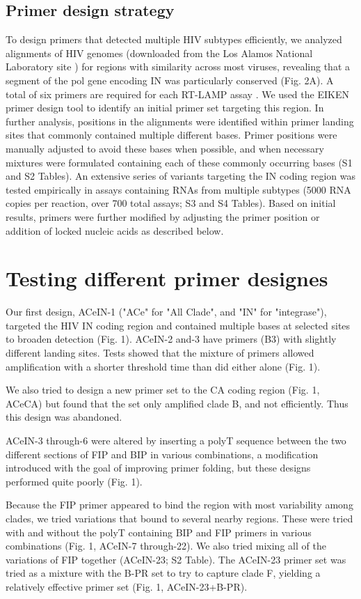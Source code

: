 \documentclass[../sherrill-Mix_thesis.tex]{subfiles}
\begin{document}
\subsection{Primer design strategy}
	To design primers that detected multiple HIV subtypes efficiently, we analyzed alignments of HIV genomes (downloaded from the Los Alamos National Laboratory site \citep{Kuiken2013}) for regions with similarity across most viruses, revealing that a segment of the pol gene encoding IN was particularly conserved (Fig. 2A). A total of six primers are required for each RT-LAMP assay \citep{Notomi2000}. We used the EIKEN primer design tool to identify an initial primer set targeting this region. In further analysis, positions in the alignments were identified within primer landing sites that commonly contained multiple different bases. Primer positions were manually adjusted to avoid these bases when possible, and when necessary mixtures were formulated containing each of these commonly occurring bases (S1 and S2 Tables). An extensive series of variants targeting the IN coding region was tested empirically in assays containing RNAs from multiple subtypes (5000 RNA copies per reaction, over 700 total assays; S3 and S4 Tables). Based on initial results, primers were further modified by adjusting the primer position or addition of locked nucleic acids as described below.

	\section{Testing different primer designes}
		Our first design, ACeIN-1 ("ACe" for "All Clade", and "IN" for "integrase"), targeted the HIV IN coding region and contained multiple bases at selected sites to broaden detection (Fig. 1). ACeIN-2 and-3 have primers (B3) with slightly different landing sites. Tests showed that the mixture of primers allowed amplification with a shorter threshold time than did either alone (Fig. 1).

		We also tried to design a new primer set to the CA coding region (Fig. 1, ACeCA) but found that the set only amplified clade B, and not efficiently. Thus this design was abandoned.

		ACeIN-3 through-6 were altered by inserting a polyT sequence between the two different sections of FIP and BIP in various combinations, a modification introduced with the goal of improving primer folding, but these designs performed quite poorly (Fig. 1).

		Because the FIP primer appeared to bind the region with most variability among clades, we tried variations that bound to several nearby regions. These were tried with and without the polyT containing BIP and FIP primers in various combinations (Fig. 1, ACeIN-7 through-22). We also tried mixing all of the variations of FIP together (ACeIN-23; S2 Table). The ACeIN-23 primer set was tried as a mixture with the B-PR set to try to capture clade F, yielding a relatively effective primer set (Fig. 1, ACeIN-23+B-PR).
\end{document}
